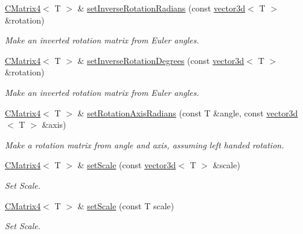 \begin{DoxyCompactItemize}
\hyperlink{classirr_1_1core_1_1CMatrix4}{C\+Matrix4}$<$ T $>$ \& \hyperlink{classirr_1_1core_1_1CMatrix4_a1a15d7b55769678512144f0fb7e15a92}{set\+Inverse\+Rotation\+Radians} (const \hyperlink{classirr_1_1core_1_1vector3d}{vector3d}$<$ T $>$ \&rotation)
\begin{DoxyCompactList}\small\item\em Make an inverted rotation matrix from Euler angles. \end{DoxyCompactList}\item 
\hyperlink{classirr_1_1core_1_1CMatrix4}{C\+Matrix4}$<$ T $>$ \& \hyperlink{classirr_1_1core_1_1CMatrix4_afd84b9c93b4c8e9dc2abefa4a28057f9}{set\+Inverse\+Rotation\+Degrees} (const \hyperlink{classirr_1_1core_1_1vector3d}{vector3d}$<$ T $>$ \&rotation)
\begin{DoxyCompactList}\small\item\em Make an inverted rotation matrix from Euler angles. \end{DoxyCompactList}\item 
\hyperlink{classirr_1_1core_1_1CMatrix4}{C\+Matrix4}$<$ T $>$ \& \hyperlink{classirr_1_1core_1_1CMatrix4_a2fad61540e78fc7dafe7f6270b0558ac}{set\+Rotation\+Axis\+Radians} (const T \&angle, const \hyperlink{classirr_1_1core_1_1vector3d}{vector3d}$<$ T $>$ \&axis)
\begin{DoxyCompactList}\small\item\em Make a rotation matrix from angle and axis, assuming left handed rotation. \end{DoxyCompactList}\item 
\mbox{\label{classirr_1_1core_1_1CMatrix4_a47117d44419af87e70084c01ab852049}} 
\hyperlink{classirr_1_1core_1_1CMatrix4}{C\+Matrix4}$<$ T $>$ \& \hyperlink{classirr_1_1core_1_1CMatrix4_a47117d44419af87e70084c01ab852049}{set\+Scale} (const \hyperlink{classirr_1_1core_1_1vector3d}{vector3d}$<$ T $>$ \&scale)
\begin{DoxyCompactList}\small\item\em Set Scale. \end{DoxyCompactList}\item 
\mbox{\label{classirr_1_1core_1_1CMatrix4_a18af980e2bc3575f60576b6d4b4cc0f3}} 
\hyperlink{classirr_1_1core_1_1CMatrix4}{C\+Matrix4}$<$ T $>$ \& \hyperlink{classirr_1_1core_1_1CMatrix4_a18af980e2bc3575f60576b6d4b4cc0f3}{set\+Scale} (const T scale)
\begin{DoxyCompactList}\small\item\em Set Scale. \end{DoxyCompactList}\item 

\end{DoxyCompactItemize}
